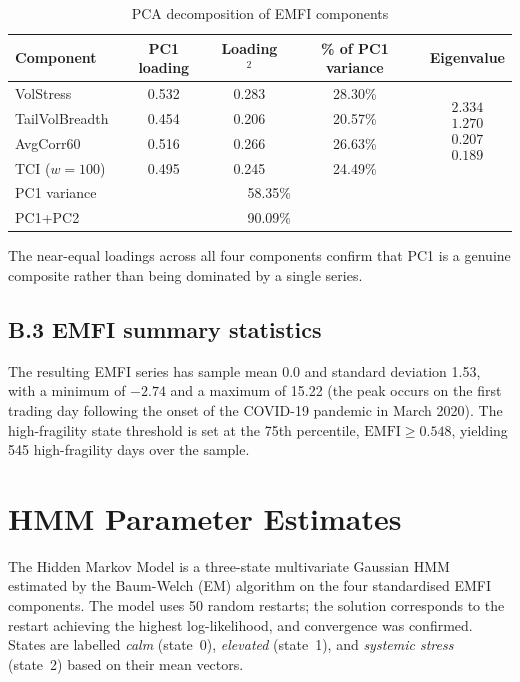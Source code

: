 \documentclass[11pt]{article}
\begin{document}
\begin{table}[ht]
\centering
\small
\caption{PCA decomposition of EMFI components}
\label{tab:app_pca}
\begin{tabular}{lcccc}
\hline\hline
Component & PC1 loading & Loading$^2$ & \% of PC1 variance & Eigenvalue \\
\hline
VolStress        & 0.532 & 0.283 & 28.30\% & \multirow{4}{*}{$\begin{array}{r}2.334\\1.270\\0.207\\0.189\end{array}$} \\
TailVolBreadth   & 0.454 & 0.206 & 20.57\% & \\
AvgCorr60        & 0.516 & 0.266 & 26.63\% & \\
TCI ($w=100$)    & 0.495 & 0.245 & 24.49\% & \\
\hline
PC1 variance & \multicolumn{3}{c}{58.35\%} & \\
PC1+PC2      & \multicolumn{3}{c}{90.09\%} & \\
\hline\hline
\end{tabular}
\end{table}

The near-equal loadings across all four components confirm that PC1 is a genuine composite rather than being dominated by a single series.

\subsection*{B.3 EMFI summary statistics}

The resulting EMFI series has sample mean 0.0 and standard deviation 1.53, with a minimum of $-2.74$ and a maximum of 15.22 (the peak occurs on the first trading day following the onset of the COVID-19 pandemic in March 2020). The high-fragility state threshold is set at the 75th percentile, $\text{EMFI} \geq 0.548$, yielding 545 high-fragility days over the sample.

\section{HMM Parameter Estimates}
\label{app:hmm}

The Hidden Markov Model is a three-state multivariate Gaussian HMM estimated by the Baum-Welch (EM) algorithm on the four standardised EMFI components. The model uses 50 random restarts; the solution corresponds to the restart achieving the highest log-likelihood, and convergence was confirmed. States are labelled \textit{calm} (state~0), \textit{elevated} (state~1), and \textit{systemic stress} (state~2) based on their mean vectors.
\end{document}

